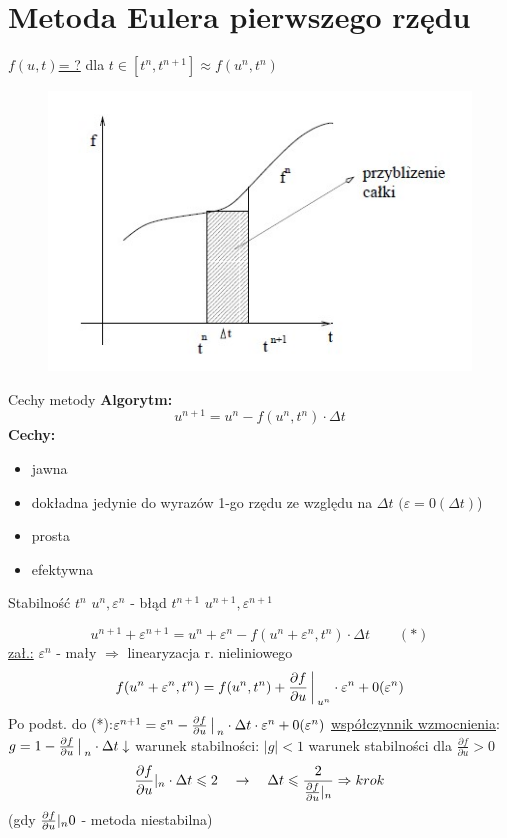 \section{Metoda Eulera pierwszego rzędu}
\begin{frame}
  \underline{$f(u,t)$= ?} \quad dla  \quad $t \in [t^n,t^{n+1}] \approx f(u^n,t^n)$
  \begin{figure}
	\includegraphics[height=0.65\textheight]{img/22/img1.jpg}
	\end{figure}
\end{frame}
\begin{frame}{Cechy metody}
  \textbf{Algorytm:}
  $$u^{n+1} = u^n - f(u^n, t^n) \cdot \Delta t$$
  \textbf{Cechy:}
  \begin{itemize}
    \item jawna
    \item dokładna jedynie do wyrazów 1-go rzędu ze względu na $\Delta t$ \quad $(\varepsilon=0(\Delta t)$)
    \item prosta
    \item efektywna
  \end{itemize}
\end{frame}
\begin{frame}{Stabilność}
  $t^n$ \quad $u^n, \varepsilon^n$ - błąd \qquad
  $t^{n+1}$ \quad $u^{n+1}, \varepsilon^{n+1}$ 

  $$u^{n+1} + \varepsilon^{n+1} = u^n+\varepsilon^n-f(u^n+\varepsilon^n,t^n)\cdot \Delta t \qquad(*)$$
  \underline{zał.:} $\varepsilon^n$ - mały $\Rightarrow$ linearyzacja r. nieliniowego
  $$f(u^n+\varepsilon^n,t^n) = f(u^n,t^n)+\frac{\partial f}{\partial u}{\bigg\arrowvert}_{u^n} \cdot \varepsilon^n+0(\varepsilon^n)$$
  Po podst. do (*):\qquad $\varepsilon^{n+1} = \varepsilon^n-\frac{\partial f}{\partial u}\big\arrowvert_n \cdot \Delta t \cdot \varepsilon^n +0(\varepsilon^n)$ \newline
  \underline{współczynnik wzmocnienia}:\qquad $g = 1- \frac{\partial f}{\partial u}{\big\arrowvert}_n \cdot \Delta t\downarrow$
  warunek stabilności: $|g|<1$ warunek stabilności dla $\frac{\partial f}{\partial u}>0$
  $$\frac{\partial f}{\partial u}\arrowvert_n \cdot \Delta t \leqslant 2 \quad 
  \rightarrow \quad \Delta t \leqslant \frac{2}{\frac{\partial f}{\partial u}\arrowvert_n} \Rightarrow krok$$
  (gdy $\frac{\partial f}{\partial u}\arrowvert_n 0$ - metoda niestabilna)
\end{frame}
